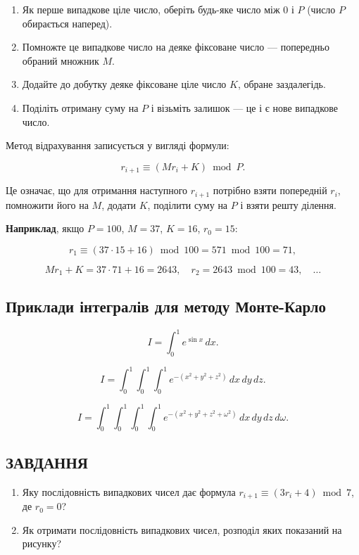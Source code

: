 \documentclass[
  ukrainian,
]{article}
\providecommand{\tightlist}{%
  \setlength{\itemsep}{0pt}\setlength{\parskip}{0pt}}
\begin{document}
\begin{enumerate}
\def\labelenumi{\arabic{enumi}.}
\tightlist
\item
  Як перше випадкове ціле число, оберіть будь-яке число між \(0\) і
  \(P\) (число \(P\) обирається наперед).
\item
  Помножте це випадкове число на деяке фіксоване число --- попередньо
  обраний множник \(M\).
\item
  Додайте до добутку деяке фіксоване ціле число \(K\), обране
  заздалегідь.
\item
  Поділіть отриману суму на \(P\) і візьміть залишок --- це і є нове
  випадкове число.
\end{enumerate}

Метод відрахування записується у вигляді формули:

\[r_{i+1} \equiv (M r_i + K) \bmod P.\]

Це означає, що для отримання наступного \(r_{i+1}\) потрібно взяти
попередній \(r_i\), помножити його на \(M\), додати \(K\), поділити суму
на \(P\) і взяти решту ділення.

\textbf{Наприклад}, якщо \(P = 100\), \(M = 37\), \(K = 16\),
\(r_0 = 15\):

\[r_1 \equiv (37 \cdot 15 + 16) \bmod 100 = 571 \bmod 100 = 71,\]

\[M r_1 + K = 37 \cdot 71 + 16 = 2643, \quad r_2 = 2643 \bmod 100 = 43, \quad \ldots\]

\subsection{Приклади інтегралів для методу
Монте-Карло}\label{ux43fux440ux438ux43aux43bux430ux434ux438-ux456ux43dux442ux435ux433ux440ux430ux43bux456ux432-ux434ux43bux44f-ux43cux435ux442ux43eux434ux443-ux43cux43eux43dux442ux435-ux43aux430ux440ux43bux43e}

\[I = \int_{0}^{1} e^{\sin x}\, dx.\]

\[I = \int_{0}^{1}\int_{0}^{1}\int_{0}^{1} e^{-(x^{2}+y^{2}+z^{2})}\, dx\, dy\, dz.\]

\[I = \int_{0}^{1}\int_{0}^{1}\int_{0}^{1}\int_{0}^{1} e^{-(x^{2}+y^{2}+z^{2}+\omega^{2})}\, dx\, dy\, dz\, d\omega.\]

\subsection{ЗАВДАННЯ}\label{ux437ux430ux432ux434ux430ux43dux43dux44f-23}

\begin{enumerate}
\def\labelenumi{\arabic{enumi}.}
\item
  Яку послідовність випадкових чисел дає формула
  \(r_{i+1} \equiv (3r_i + 4) \bmod 7\), де \(r_0 = 0\)?
\item
  Як отримати послідовність випадкових чисел, розподіл яких показаний на
  рисунку?
\end{enumerate}
\end{document}
